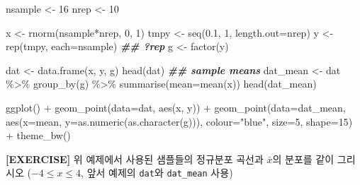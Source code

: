 \documentclass[
]{book}
\newenvironment{Shaded}{\begin{snugshade}}{\end{snugshade}}
\newcommand{\AttributeTok}[1]{\textcolor[rgb]{0.77,0.63,0.00}{#1}}
\newcommand{\DecValTok}[1]{\textcolor[rgb]{0.00,0.00,0.81}{#1}}
\newcommand{\DocumentationTok}[1]{\textcolor[rgb]{0.56,0.35,0.01}{\textbf{\textit{#1}}}}
\newcommand{\FloatTok}[1]{\textcolor[rgb]{0.00,0.00,0.81}{#1}}
\newcommand{\FunctionTok}[1]{\textcolor[rgb]{0.00,0.00,0.00}{#1}}
\newcommand{\NormalTok}[1]{#1}
\newcommand{\OtherTok}[1]{\textcolor[rgb]{0.56,0.35,0.01}{#1}}
\newcommand{\SpecialCharTok}[1]{\textcolor[rgb]{0.00,0.00,0.00}{#1}}
\newcommand{\StringTok}[1]{\textcolor[rgb]{0.31,0.60,0.02}{#1}}
\begin{document}
\begin{Shaded}
\begin{Highlighting}[]
\NormalTok{nsample }\OtherTok{\textless{}{-}} \DecValTok{16}
\NormalTok{nrep }\OtherTok{\textless{}{-}} \DecValTok{10}

\NormalTok{x }\OtherTok{\textless{}{-}} \FunctionTok{rnorm}\NormalTok{(nsample}\SpecialCharTok{*}\NormalTok{nrep, }\DecValTok{0}\NormalTok{, }\DecValTok{1}\NormalTok{)}
\NormalTok{tmpy }\OtherTok{\textless{}{-}} \FunctionTok{seq}\NormalTok{(}\FloatTok{0.1}\NormalTok{, }\DecValTok{1}\NormalTok{, }\AttributeTok{length.out=}\NormalTok{nrep)}
\NormalTok{y }\OtherTok{\textless{}{-}} \FunctionTok{rep}\NormalTok{(tmpy, }\AttributeTok{each=}\NormalTok{nsample)}
\DocumentationTok{\#\# ?rep}
\NormalTok{g }\OtherTok{\textless{}{-}} \FunctionTok{factor}\NormalTok{(y)}

\NormalTok{dat }\OtherTok{\textless{}{-}} \FunctionTok{data.frame}\NormalTok{(x, y, g)}
\FunctionTok{head}\NormalTok{(dat)}
\DocumentationTok{\#\# sample means}
\NormalTok{dat\_mean }\OtherTok{\textless{}{-}}\NormalTok{ dat }\SpecialCharTok{\%\textgreater{}\%} 
  \FunctionTok{group\_by}\NormalTok{(g) }\SpecialCharTok{\%\textgreater{}\%} 
  \FunctionTok{summarise}\NormalTok{(}\AttributeTok{mean=}\FunctionTok{mean}\NormalTok{(x))}
\FunctionTok{head}\NormalTok{(dat\_mean)}

\FunctionTok{ggplot}\NormalTok{() }\SpecialCharTok{+} 
  \FunctionTok{geom\_point}\NormalTok{(}\AttributeTok{data=}\NormalTok{dat, }\FunctionTok{aes}\NormalTok{(x, y)) }\SpecialCharTok{+}
  \FunctionTok{geom\_point}\NormalTok{(}\AttributeTok{data=}\NormalTok{dat\_mean, }
             \FunctionTok{aes}\NormalTok{(}\AttributeTok{x=}\NormalTok{mean, }\AttributeTok{y=}\FunctionTok{as.numeric}\NormalTok{(}\FunctionTok{as.character}\NormalTok{(g))), }
             \AttributeTok{colour=}\StringTok{"blue"}\NormalTok{, }
             \AttributeTok{size=}\DecValTok{5}\NormalTok{, }
             \AttributeTok{shape=}\DecValTok{15}\NormalTok{) }\SpecialCharTok{+}
  \FunctionTok{theme\_bw}\NormalTok{()}
  
\end{Highlighting}
\end{Shaded}

\textbf{{[}EXERCISE{]}} 위 예제에서 사용된 샘플들의 정규분포 곡선과 \(\bar{x}\)의 분포를 같이 그리시오 (\(-4 \le x \le 4\), 앞서 예제의 \texttt{dat}와 \texttt{dat\_mean} 사용)
\end{document}
